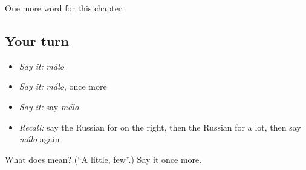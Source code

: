 \begin{grammarlens}[title={What you've built}]
One more word for this chapter.
\end{grammarlens}

\subsection*{Your turn}
\begin{itemize}
\raggedright
  \item \emph{Say it:} \emph{málo}
  \item \emph{Say it:} \emph{málo}, once more
  \item \emph{Say it:} say \emph{málo}
  \item \emph{Recall:} say the Russian for on the right, then the Russian for a lot, then say \emph{málo} again
\end{itemize}

\begin{tcolorbox}[breakable,colback=teal!4,colframe=teal!35!black,title={Before you move on}]
What does  mean? (\textquotedblleft{}A little, few\textquotedblright{}.) Say it once more.
\end{tcolorbox}
